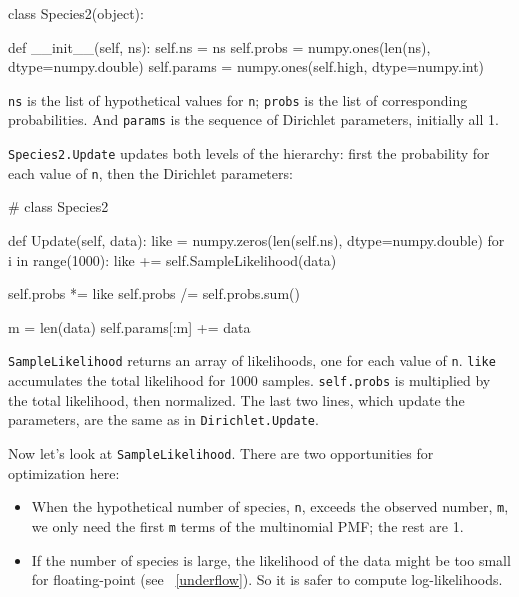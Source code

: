 \documentclass[12pt]{book}
\theoremstyle{exercise}
\begin{document}
\begin{code}
class Species2(object):
    
    def __init__(self, ns):
        self.ns = ns
        self.probs = numpy.ones(len(ns), dtype=numpy.double)
        self.params = numpy.ones(self.high, dtype=numpy.int)
\end{code}

{\tt ns} is the list of hypothetical values for {\tt n};
{\tt probs} is the list of corresponding probabilities.  And
{\tt params} is the sequence of Dirichlet parameters, initially
all 1.

{\tt Species2.Update} updates both levels of
the hierarchy: first the probability for each value of {\tt n},
then the Dirichlet parameters:

\begin{code}
# class Species2

    def Update(self, data):
        like = numpy.zeros(len(self.ns), dtype=numpy.double)
        for i in range(1000):
            like += self.SampleLikelihood(data)

        self.probs *= like
        self.probs /= self.probs.sum()

        m = len(data)
        self.params[:m] += data
\end{code}

{\tt SampleLikelihood} returns an array of likelihoods, one for each
value of {\tt n}.  {\tt like} accumulates the total likelihood for
1000 samples.  {\tt self.probs} is multiplied by the total likelihood,
then normalized.  The last two lines, which update the parameters,
are the same as in {\tt Dirichlet.Update}.

Now let's look at {\tt SampleLikelihood}.  There are two
opportunities for optimization here:

\begin{itemize}

\item When the hypothetical number of species, {\tt n},
exceeds the observed number, {\tt m}, we only need the first {\tt m}
terms of the multinomial PMF; the rest are 1.

\item If the number of species is large, the likelihood of the data
  might be too small for floating-point (see ~\ref{underflow}).  So it
  is safer to compute log-likelihoods.
   

\end{itemize}
\end{document}
